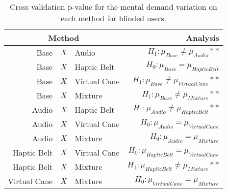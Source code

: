 
\begin{table}[!htb]
\centering
\caption{Cross validation p-value for the mental demand variation on each method for blinded users.}
\label{tab:lsdbloc_mental_demand_var}
\begin{tabular}{rclr}
\toprule
      \multicolumn{3}{c}{Method} &                                       Analysis \\
\midrule
              Base & $X$ & Audio &           $H_1 : \mu_{Base} \ne \mu_{Audio}**$ \\
        Base & $X$ & Haptic Belt &         $H_0 : \mu_{Base} = \mu_{Haptic Belt}$ \\
       Base & $X$ & Virtual Cane &    $H_1 : \mu_{Base} \ne \mu_{Virtual Cane}**$ \\
            Base & $X$ & Mixture &         $H_1 : \mu_{Base} \ne \mu_{Mixture}**$ \\
       Audio & $X$ & Haptic Belt &    $H_1 : \mu_{Audio} \ne \mu_{Haptic Belt}**$ \\
      Audio & $X$ & Virtual Cane &       $H_0 : \mu_{Audio} = \mu_{Virtual Cane}$ \\
           Audio & $X$ & Mixture &            $H_0 : \mu_{Audio} = \mu_{Mixture}$ \\
Haptic Belt & $X$ & Virtual Cane & $H_0 : \mu_{Haptic Belt} = \mu_{Virtual Cane}$ \\
     Haptic Belt & $X$ & Mixture &  $H_1 : \mu_{Haptic Belt} \ne \mu_{Mixture}**$ \\
    Virtual Cane & $X$ & Mixture &     $H_0 : \mu_{Virtual Cane} = \mu_{Mixture}$ \\
\bottomrule
\end{tabular}
\end{table}

